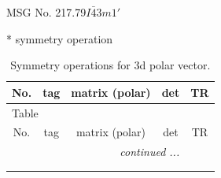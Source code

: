 \documentclass[fleqn,8pt]{jsarticle}
\begin{document}
\setcounter{MaxMatrixCols}{32}

\renewcommand{\tablename}{Table~}
\renewcommand{\figurename}{Figure~}
\begin{center}
\LARGE
MSG No. 217.79\quad$I\bar{4}3m1'$
\end{center}
* symmetry operation
\renewcommand{\arraystretch}{1.3}
\begin{longtable}{ccccc}
\caption{Symmetry operations for 3d polar vector.}
 \\
 \hline \hline
No. & tag & matrix (polar) & det & TR \\ \hline \endfirsthead

\multicolumn{4}{l}{\tablename\ \thetable{}} \\
 \hline \hline
No. & tag & matrix (polar) & det & TR \\ \hline \endhead

 \hline \hline
\multicolumn{4}{r}{\footnotesize\it continued ...} \\ \endfoot

 \hline \hline
\multicolumn{4}{r}{} \\ \endlastfoot


\end{longtable}
\end{document}

